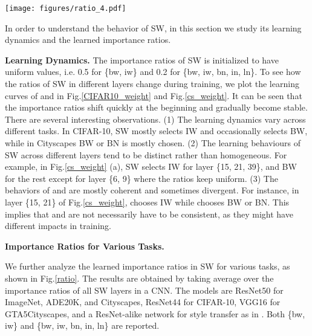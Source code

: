 \documentclass[10pt,twocolumn,letterpaper]{article}
\begin{document}
\begin{figure*}[t!]
	\centering
	\texttt{[image: figures/ratio\_4.pdf]}
	\caption{Learned importance ratios of SW in various tasks. Above and below correspond to  \{bw, iw\} and  \{bw, iw, bn, in, ln\} respectively.}
	\label{ratio}
	\vspace{-8pt}
\end{figure*}

In order to understand the behavior of SW, in this section we study its learning dynamics and the learned importance ratios.

\noindent\textbf{Learning Dynamics.}
The importance ratios of SW is initialized to have uniform values, i.e. 0.5 for  \{bw, iw\} and 0.2 for  \{bw, iw, bn, in, ln\}.
To see how the ratios of SW in different layers change during training, we plot the learning curves of  and  in Fig.\ref{CIFAR10_weight} and Fig.\ref{cs_weight}. It can be seen that the importance ratios shift quickly at the beginning and gradually become stable.
There are several interesting observations.
(1) The learning dynamics vary across different tasks.
In CIFAR-10, SW mostly selects IW and occasionally selects BW, while in Cityscapes BW or BN is mostly chosen.
(2) The learning behaviours of SW across different layers tend to be distinct rather than homogeneous.
For example, in Fig.\ref{cs_weight} (a), SW selects IW for layer \{15, 21, 39\}, and BW for the rest except for layer \{6, 9\} where the ratios keep uniform.
(3) The behaviors of  and  are mostly coherent and sometimes divergent.
For instance, in layer \{15, 21\} of Fig.\ref{cs_weight},  chooses IW while  chooses BW or BN.
This implies that  and  are not necessarily have to be consistent, as they might have different impacts in training.


\noindent\textbf{Importance Ratios for Various Tasks.}

We further analyze the learned importance ratios in SW for various tasks, as shown in Fig.\ref{ratio}.
The results are obtained by taking average over the importance ratios  of all SW layers in a CNN.
The models are ResNet50 for ImageNet, ADE20K, and Cityscapes, ResNet44 for CIFAR-10, VGG16 for GTA5Cityscapes, and a ResNet-alike network for style transfer as in \cite{johnson2016perceptual}.
Both  \{bw, iw\} and  \{bw, iw, bn, in, ln\} are reported.
\end{document}
